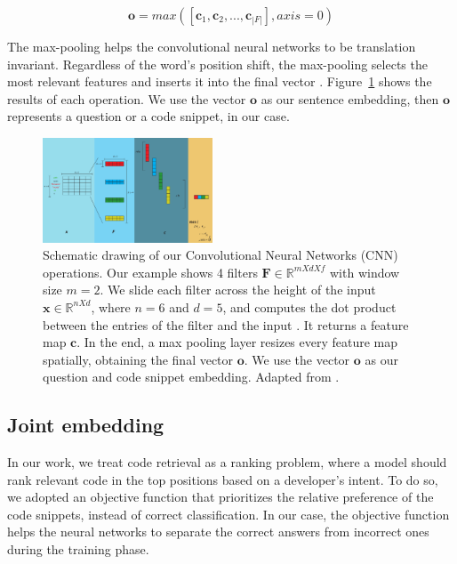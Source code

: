 \documentclass[sigconf]{acmart}
\begin{document}
\begin{equation}
    \bm{o} = max\left(\left[\bm{c}_{1}, \bm{c}_{2}, . . ., \bm{c}_{|F|}\right], axis = 0\right)
\end{equation}

The max-pooling helps the convolutional neural networks to be translation invariant. Regardless of the word's position shift, the max-pooling selects the most relevant features and inserts it into the final vector \citep{tom-young:trends-deep-learning-nlp}. Figure~\ref{fig:cnn-steps-word-embedding} shows the results of each operation. We use the vector $\bm{o}$ as our sentence embedding, then $\bm{o}$ represents a question or a code snippet, in our case. 

\begin{figure}[h]
    \centering
    \includegraphics[width=0.45\textwidth]{figuras/cnn-steps-word-embedding-article.pdf}
    \caption{Schematic drawing of our Convolutional Neural Networks (CNN) operations. Our example shows 4 filters $\bm{F} \in \mathbb{R}^{m X d X f}$ with window size $m = 2$. We slide each filter across the height of the input $\bm{x} \in \mathbb{R}^{n X d}$, where $n = 6$ and $d = 5$, and computes the dot product between the entries of the filter and the input \cite{karpathy-course-cnn-2016}. It returns a feature map $\bm{c}$. In the end, a max pooling layer resizes every feature map spatially, obtaining the final vector $\bm{o}$. We use the vector $\bm{o}$ as our question and code snippet embedding. Adapted from \cite{zhang-guide-convolutional-cnn-embedding-ilustration:2015}.}
    \label{fig:cnn-steps-word-embedding}
\end{figure}

\subsection{Joint embedding}
\label{sec:joint-embedding}

In our work, we treat code retrieval as a ranking problem, where a model should rank relevant code in the top positions based on a developer's intent. To do so, we adopted an objective function that prioritizes the relative preference of the code snippets, instead of correct classification. In our case, the objective function helps the neural networks to separate the correct answers from incorrect ones during the training phase.
\end{document}
